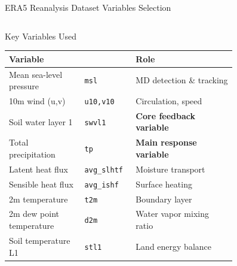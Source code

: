 \documentclass[10pt, aspectratio=169,t,xcolor=table]{beamer}
\begin{document}
\begin{frame}{ERA5 Reanalysis Dataset Variables Selection}
	\begin{columns}
		\begin{block}{\small Key Variables Used}
			\footnotesize
			\begin{tabular}{p{0.30\linewidth} p{0.18\linewidth} p{0.40\linewidth}}
				\toprule
				\rowcolor{MyBlue!15}
				\textbf{Variable}        &                     & \textbf{Role}                   \\
				\midrule
				Mean sea-level pressure  & \texttt{msl}        & MD detection \& tracking        \\
				10m wind (u,v)           & \texttt{u10,v10}    & Circulation, speed              \\
				Soil water layer 1       & \texttt{swvl1}      & \textbf{Core feedback variable} \\
				Total precipitation      & \texttt{tp}         & \textbf{Main response variable} \\
				Latent heat flux         & \texttt{avg\_slhtf} & Moisture transport              \\
				Sensible heat flux       & \texttt{avg\_ishf}  & Surface heating                 \\
				2m temperature           & \texttt{t2m}        & Boundary layer                  \\
				2m dew point temperature & \texttt{d2m}        & Water vapor mixing ratio        \\
				Soil temperature L1      & \texttt{stl1}       & Land energy balance             \\
				\bottomrule
			\end{tabular}
		\end{block}
	\end{columns}
\end{frame}

\end{document}
